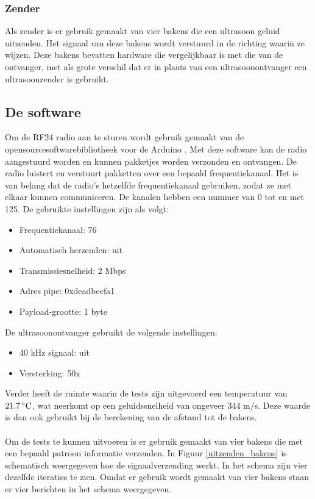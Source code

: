 \documentclass{article}
\begin{document}
\subsubsection{Zender}
Als zender is er gebruik gemaakt van vier bakens die een ultrasoon geluid uitzenden. Het signaal van deze bakens wordt verstuurd in de richting waarin ze wijzen. Deze bakens bevatten hardware die vergelijkbaar is met die van de ontvanger, met als grote verschil dat er in plaats van een ultrasoonontvanger een ultrasoonzender is gebruikt.
\\

\subsection{De software}
Om de RF24 radio aan te sturen wordt gebruik gemaakt van de opensourcesoftwarebibliotheek voor de Arduino \cite{rf24}. Met deze software kan de radio aangestuurd worden en kunnen pakketjes worden verzonden en ontvangen. De radio luistert en verstuurt pakketten over een bepaald frequentiekanaal. Het is van belang dat de radio's hetzelfde frequentiekanaal gebruiken, zodat ze met elkaar kunnen communiceren. De kanalen hebben een nummer van 0 tot en met 125. De gebruikte instellingen zijn als volgt:
\begin{itemize}
	\item Frequentiekanaal: 76 
	\item Automatisch herzenden: uit
	\item Transmissiesnelheid: 2 Mbps
	\item Adres pipe: 0xdeadbeefa1
	\item Payload-grootte: 1 byte
\end{itemize}
De ultrasoonontvanger gebruikt de volgende instellingen:
\begin{itemize}
	\item 40 kHz signaal: uit
	\item Versterking: 50x
\end{itemize}
Verder heeft de ruimte waarin de tests zijn uitgevoerd een temperatuur van $21.7\,^{\circ}{\rm C}$, wat neerkomt op een geluidssnelheid van ongeveer 344 m/s. Deze waarde is dan ook gebruikt bij de berekening van de afstand tot de bakens.\\
\\
Om de tests te kunnen uitvoeren is er gebruik gemaakt van vier bakens die met een bepaald patroon informatie verzenden. In Figuur \ref{uitzenden_bakens} is schematisch weergegeven hoe de signaalverzending werkt. In het schema zijn vier dezelfde iteraties te zien. Omdat er gebruik wordt gemaakt van vier bakens staan er vier berichten in het schema weergegeven. \\
\end{document}
